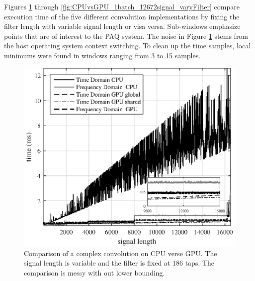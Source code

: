 Figures \ref{fig:CPUvsGPU_1batch_186taps_varySignal_noMin} through \ref{fig:CPUvsGPU_1batch_12672signal_varyFilter} compare execution time of the five different convolution implementations by fixing the filter length with variable signal length or visa versa.
Sub-windows emphasize points that are of interest to the PAQ system.
The noise in Figure \ref{fig:CPUvsGPU_1batch_186taps_varySignal_noMin} stems from the host operating system context switching.
To clean up the time samples, local minimums were found in windows ranging from 3 to 15 samples.
\begin{figure}
	\centering\includegraphics[width=5in]{figures/gpu_intro/CPUvsGPU_1batch_186taps_varySignal_noMin.eps}
	\caption{Comparison of a complex convolution on CPU verse GPU. The signal length is variable and the filter is fixed at $186$ taps. The comparison is messy with out lower bounding.}
	\label{fig:CPUvsGPU_1batch_186taps_varySignal_noMin}
\end{figure}
